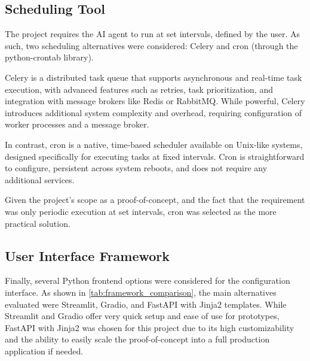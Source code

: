\documentclass[a4paper]{report}
\begin{document}
\subsection{Scheduling Tool}

The project requires the AI agent to run at set intervals, defined by the user. As such, two scheduling alternatives were considered: Celery and cron (through the python-crontab library).

Celery is a distributed task queue that supports asynchronous and real-time task execution, with advanced features such as retries, task prioritization, and integration with message brokers like Redis or RabbitMQ. While powerful, Celery introduces additional system complexity and overhead, requiring configuration of worker processes and a message broker.

In contrast, cron is a native, time-based scheduler available on Unix-like systems, designed specifically for executing tasks at fixed intervals. Cron is straightforward to configure, persistent across system reboots, and does not require any additional services.

Given the project's scope as a proof-of-concept, and the fact that the requirement was only periodic execution at set intervals, cron was selected as the more practical solution.

\subsection{User Interface Framework}

Finally, several Python frontend options were considered for the configuration interface. As shown in \autoref{tab:framework_comparison}, the main alternatives evaluated were Streamlit, Gradio, and FastAPI with Jinja2 templates. While Streamlit and Gradio offer very quick setup and ease of use for prototypes, FastAPI with Jinja2 was chosen for this project due to its high customizability and the ability to easily scale the proof-of-concept into a full production application if needed.
\end{document}
